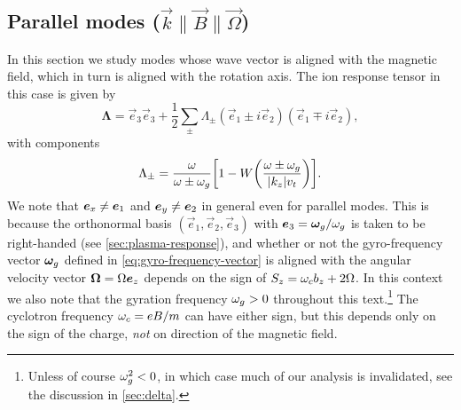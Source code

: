 \documentclass[aps,pre,notitlepage,amsmath,amssymb,amsfonts,nobibnotes,nofootinbib,superscriptaddress]{revtex4-1}
\begin{document}
\subsection{Parallel modes
  ($\vec{k}\bm{\parallel}\vec{B}\bm{\parallel}\vec{\Omega}$)}
\label{sec:par}

In this section we study modes whose wave vector is aligned with the magnetic
field, which in turn is aligned with the rotation axis. The ion response
tensor in this case is given by
\begin{equation}
  \label{eq:parallel-response}
  \mathbf{\Lambda} =
  \vec{e}_3\vec{e}_3 + \frac{1}{2}\sum_\pm\Lambda^{}_\pm
  (\vec{e}_1\pm i\vec{e}_2)(\vec{e}_1\mp i\vec{e}_2),
\end{equation}
with components
\begin{equation}
  \label{eq:circular-components}
  \Lambda_\pm = \frac{\omega}{\omega\pm\omg}
  \left[1 - W\left(\frac{\omega\pm\omg}{|k_z|\vt}\right)\right].
\end{equation}
We note that $\bm{e}_x\ne\bm{e}_1$ and $\bm{e}_y\ne\bm{e}_2$ in general even for
parallel modes. This is because the orthonormal basis
$(\vec{e}_1,\vec{e}_2,\vec{e}_3)$ with $\bm{e}_3=\bm{\omega}_g/\omega_g$ is taken to be
right-handed (see \cref{sec:plasma-response}), and whether or not the
gyro-frequency vector $\bm{\omega}_g$ defined in \cref{eq:gyro-frequency-vector} is
aligned with the angular velocity vector $\bm{\Omega}=\Omega\bm{e}_z$ depends on
the sign of $S_z=\omega_c{}b_z+2\Omega$. In this context we also note that the
gyration frequency $\omega_g>0$ throughout this text.\footnote{Unless of course
  $\omega_g^2<0$, in which case much of our analysis is invalidated, see the
  discussion in \cref{sec:delta}.} The cyclotron frequency $\omega_c=eB/m$ can
have either sign, but this depends only on the sign of the charge, \emph{not}
on direction of the magnetic field.
\end{document}
